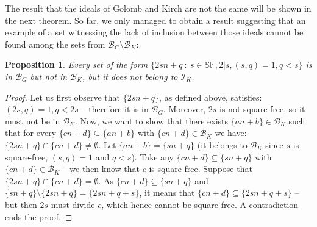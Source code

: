 \documentclass{amsart}
\newtheorem{prop}{Proposition}
\theoremstyle{definition}
\theoremstyle{definition}
\newcommand{\I}{\mathcal I}
\newcommand{\B}{\mathcal{B}}
\newcommand{\SqrFr}{\mathbb{SF}}
\begin{document}
The result that the ideals of Golomb and Kirch are not the same will be shown in the next theorem. So far, we only managed to obtain a result suggesting that an example of a set witnessing the lack of inclusion between those ideals cannot be found among the sets from $\B_G \setminus \B_K$:


\begin{prop}
Every set of the form $\{2sn+q\ :\ s \in\SqrFr, 2|s, (s,q)=1, q<s\}$ is in $\B_G$ but not in $\B_K$, but it does not belong to $\I_K$.
\end{prop}

\begin{proof}
Let us first observe that $\{2sn+q\}$, as defined above, satisfies: $(2s,q)=1, q<2s$ -- therefore it is in $\B_G$. Moreover, $2s$ is not square-free, so it must not be in $\B_K$.
Now, we want to show that there exists $\{an+b\}\in \B_K$ such that for every $\{cn+d\}\subseteq \{an+b\}$ with $\{cn+d\}\in \B_K$ we have: $\{2sn+q\}\cap \{cn+d\} \neq \emptyset$. Let $\{an+b\} = \{sn+q\}$ (it belongs to $\B_K$ since $s$ is square-free, $(s,q)=1$ and $q<s$). Take any $\{cn+d\}\subseteq \{sn+q\}$ with $\{cn+d\}\in \B_K$ -- we then know that $c$ is square-free. Suppose that $\{2sn+q\}\cap \{cn+d\} = \emptyset$. As $\{cn+d\}\subseteq \{sn+q\}$ and $\{sn+q\} \setminus \{2sn+q\} = \{2sn+q+s\}$, it means that $\{cn+d\}\subseteq \{2sn+q+s\}$ -- but then $2s$ must divide $c$, which hence cannot be square-free. A contradiction ends the proof.
\end{proof}
\end{document}
